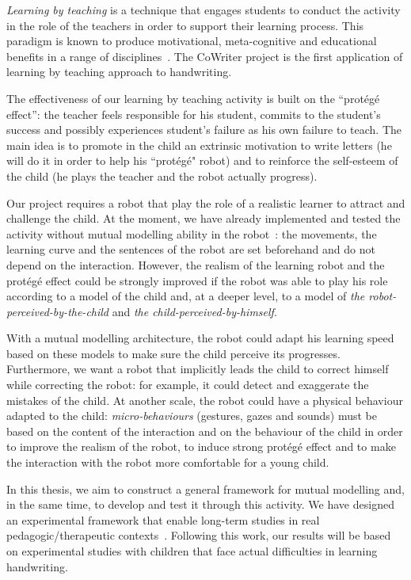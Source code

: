 \documentclass[10pt,a4paper]{article}
\begin{document}
\emph{Learning by teaching} is a technique that engages students to conduct the activity in the role of the teachers in order to support their learning process. This 
paradigm is known to produce motivational, meta-cognitive and educational
benefits in a range of disciplines~\cite{Rohrbeck2003}. The CoWriter project
is the first application of learning by teaching approach to handwriting. 

The effectiveness of our learning by teaching activity is built on the
``prot\'eg\'e effect'': the teacher feels responsible for his student, commits
to the student's success and possibly experiences student's failure as his own
failure to teach. The main idea is to promote in the child an extrinsic motivation to write letters (he will do it in order to help his ``prot\'eg\'e" robot) and to reinforce the self-esteem of the child (he plays the teacher and the robot actually progress).

Our project requires a robot that play the role of a realistic learner to attract and challenge the child. At the moment, we have already implemented and tested the activity without mutual modelling ability in the robot~\cite{Hood}: the movements, the learning curve and the sentences of the robot are set beforehand and do not depend on the interaction. However, the realism of the learning robot and the prot\'eg\'e effect could be strongly improved if the robot was able to play his role according to a model of the child and, at a deeper level, to a model of \textit{the robot-perceived-by-the-child} and \textit{the child-perceived-by-himself}.

With a mutual modelling architecture, the robot could adapt his learning speed based on these models to make sure the child perceive its progresses. Furthermore, we want a robot that implicitly leads the child to correct himself while correcting the robot: for example, it could detect and exaggerate the mistakes of the child. At another scale, the robot could have a physical behaviour adapted to the child: \textit{micro-behaviours} (gestures, gazes and sounds) must be based on the content of the interaction and on the behaviour of the child in order to improve the realism of the robot, to induce strong prot\'eg\'e effect and to make the interaction with the robot more comfortable for a young child. 

In this thesis, we aim to construct a general framework for mutual modelling and, in the same time, to develop and test it through this activity. We have designed an experimental framework that enable long-term studies in real pedagogic/therapeutic contexts~\cite{jacq2016building}. Following this work, our results will be based on experimental studies with children that face actual difficulties in learning handwriting.
\end{document}
